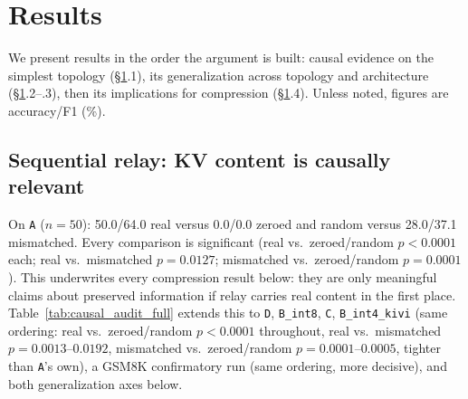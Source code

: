 \documentclass[11pt]{article}
\begin{document}
\section{Results}
\label{sec:results}

We present results in the order the argument is built: causal evidence
on the simplest topology (\S\ref{sec:results}.1), its generalization
across topology and architecture (\S\ref{sec:results}.2--.3), then its
implications for compression (\S\ref{sec:results}.4). Unless noted,
figures are accuracy/F1 (\%).



\subsection{Sequential relay: KV content is causally relevant}

On \texttt{A} ($n=50$): 50.0/64.0 real versus 0.0/0.0 zeroed and random
versus 28.0/37.1 mismatched. Every comparison is significant (real
vs.\ zeroed/random $p<0.0001$ each; real vs.\ mismatched $p=0.0127$;
mismatched vs.\ zeroed/random $p=0.0001$). This underwrites every
compression result below: they are only meaningful claims about
preserved information if relay carries real content in the first
place. Table~\ref{tab:causal_audit_full}
extends this to \texttt{D}, \texttt{B\_int8}, \texttt{C},
\texttt{B\_int4\_kivi} (same ordering: real vs.\ zeroed/random
$p<0.0001$ throughout, real vs.\ mismatched $p=0.0013$--$0.0192$,
mismatched vs.\ zeroed/random $p=0.0001$--$0.0005$, tighter than
\texttt{A}'s own), a GSM8K confirmatory run (same ordering, more
decisive), and both generalization axes below.


\end{document}
